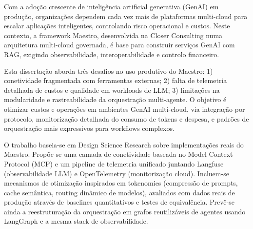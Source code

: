 
%

Com a adoção crescente de inteligência artificial generativa (GenAI) em produção, organizações dependem cada vez mais de plataformas multi-cloud para escalar aplicações inteligentes, controlando risco operacional e custos. Neste contexto, a framework Maestro, desenvolvida na Closer Consulting numa arquitetura multi-cloud governada, é base para construir serviços GenAI com RAG, exigindo observabilidade, interoperabilidade e controlo financeiro.

Esta dissertação aborda três desafios no uso produtivo do Maestro: 1) conetividade fragmentada com ferramentas externas; 2) falta de telemetria detalhada de custos e qualidade em workloads de LLM; 3) limitações na modularidade e rastreabilidade da orquestração multi-agente. O objetivo é otimizar custos e operações em ambientes GenAI multi-cloud, via integração por protocolo, monitorização detalhada do consumo de tokens e despesa, e padrões de orquestração mais expressivos para workflows complexos.

O trabalho baseia-se em Design Science Research sobre implementações reais do Maestro. Propõe-se uma camada de conetividade baseada no Model Context Protocol (MCP) e um pipeline de telemetria unificado juntando Langfuse (observabilidade LLM) e OpenTelemetry (monitorização cloud). Incluem-se mecanismos de otimização inspirados em tokenomics (compressão de prompts, cache semântica, routing dinâmico de modelos), avaliados com dados reais de produção através de baselines quantitativos e testes de equivalência. Prevê-se ainda a reestruturação da orquestração em grafos reutilizáveis de agentes usando LangGraph e a mesma stack de observabilidade.

